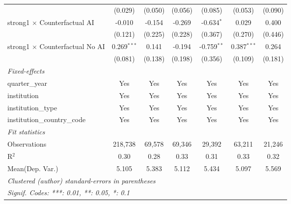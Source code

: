 \begin{tabular}{lcccccc}
                                          & (0.029)       & (0.050)       & (0.056)       & (0.085)       & (0.053)       & (0.090)\\   
   strong1 $\times$ Counterfactual AI     & -0.010        & -0.154        & -0.269        & -0.634$^{*}$  & 0.029         & 0.400\\   
                                          & (0.121)       & (0.225)       & (0.228)       & (0.367)       & (0.270)       & (0.446)\\   
   strong1 $\times$ Counterfactual No AI  & 0.269$^{***}$ & 0.141         & -0.194        & -0.759$^{**}$ & 0.387$^{***}$ & 0.264\\   
                                          & (0.081)       & (0.138)       & (0.198)       & (0.356)       & (0.109)       & (0.181)\\   
   \midrule
   \emph{Fixed-effects}\\
   quarter\_year                          & Yes           & Yes           & Yes           & Yes           & Yes           & Yes\\  
   institution                            & Yes           & Yes           & Yes           & Yes           & Yes           & Yes\\  
   institution\_type                      & Yes           & Yes           & Yes           & Yes           & Yes           & Yes\\  
   institution\_country\_code             & Yes           & Yes           & Yes           & Yes           & Yes           & Yes\\  
   \midrule
   \emph{Fit statistics}\\
   Observations                           & 218,738       & 69,578        & 69,346        & 29,392        & 63,211        & 21,246\\  
   R$^2$                                  & 0.30          & 0.28          & 0.33          & 0.31          & 0.33          & 0.32\\  
Mean(Dep. Var.) & 5.105 & 5.383 & 5.112 & 5.434 & 5.097 & 5.569 \\
   \midrule \midrule
   \multicolumn{7}{l}{\emph{Clustered (author) standard-errors in parentheses}}\\
   \multicolumn{7}{l}{\emph{Signif. Codes: ***: 0.01, **: 0.05, *: 0.1}}\\
\end{tabular}
\par\endgroup
